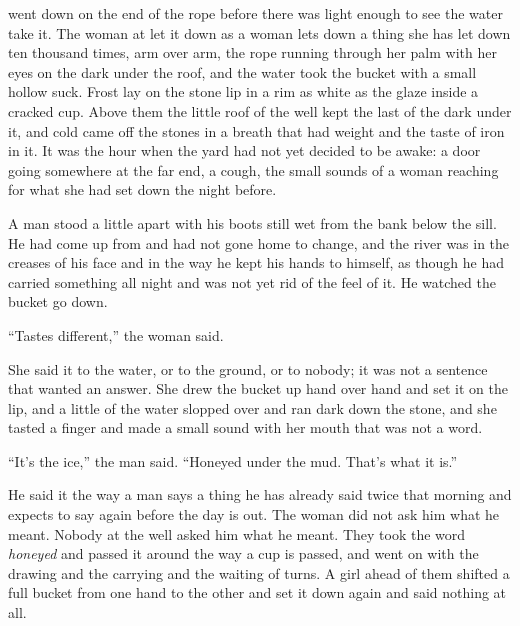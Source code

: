 
 went down on the end of the rope before there was light enough to see the water take it. The woman at  let it down as a woman lets down a thing she has let down ten thousand times, arm over arm, the rope running through her palm with her eyes on the dark under the roof, and the water took the bucket with a small hollow suck. Frost lay on the stone lip in a rim as white as the glaze inside a cracked cup. Above them the little roof of the well kept the last of the dark under it, and cold came off the stones in a breath that had weight and the taste of iron in it. It was the hour when the yard had not yet decided to be awake: a door going somewhere at the far end, a cough, the small sounds of a woman reaching for what she had set down the night before.

A man stood a little apart with his boots still wet from the bank below the sill. He had come up from  and had not gone home to change, and the river was in the creases of his face and in the way he kept his hands to himself, as though he had carried something all night and was not yet rid of the feel of it. He watched the bucket go down.

“Tastes different,” the woman said.

She said it to the water, or to the ground, or to nobody; it was not a sentence that wanted an answer. She drew the bucket up hand over hand and set it on the lip, and a little of the water slopped over and ran dark down the stone, and she tasted a finger and made a small sound with her mouth that was not a word.

“It's the ice,” the man said. “Honeyed under the mud. That's what it is.”

He said it the way a man says a thing he has already said twice that morning and expects to say again before the day is out. The woman did not ask him what he meant. Nobody at the well asked him what he meant. They took the word \emph{honeyed} and passed it around the way a cup is passed, and went on with the drawing and the carrying and the waiting of turns. A girl ahead of them shifted a full bucket from one hand to the other and set it down again and said nothing at all.

